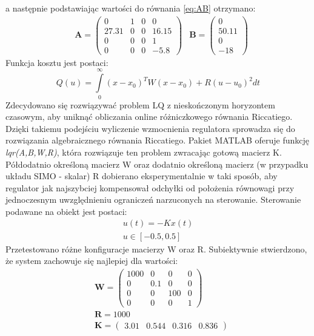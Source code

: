 a następnie podstawiając wartości do równania \ref{eq:AB} otrzymano:
\begin{equation}
\label{eq:ABwar}
\begin{aligned}
&\mathbf{A} =
\left( \begin{array}{cccc}
0 & 1 & 0 & 0 \\
27.31 & 0 & 0 & 16.15 \\
0 & 0 & 0 & 1 \\
0 & 0 & 0 & -5.8
\end{array} \right)
&\mathbf{B} =
\left( \begin{array}{cccc}
0 \\
50.11 \\
0 \\
-18
\end{array} \right)
\end{aligned}
\end{equation}
Funkcja kosztu jest postaci:
\begin{equation}
Q(u) = \int\limits_{0}^{\infty}  \left( x-x_{0}\right)^TW\left( x-x_{0}\right) + R\left( u-u_{0}\right)^2  dt
\label{eq:cost}  
\end{equation}
Zdecydowano się rozwiązywać problem LQ z nieskończonym horyzontem czasowym, aby uniknąć obliczania online różniczkowego równania Riccatiego. Dzięki takiemu podejściu wyliczenie wzmocnienia regulatora sprowadza się do rozwiązania algebraicznego równania Riccatiego. Pakiet MATLAB oferuje funkcję \textit{lqr(A,B,W,R)}, która rozwiązuje ten problem zwracając gotową macierz K. Półdodatnio określoną macierz W oraz dodatnio określoną macierz (w przypadku układu SIMO - skalar) R dobierano eksperymentalnie w taki sposób, aby regulator jak najszybciej kompensował odchyłki od położenia równowagi przy jednoczesnym uwzględnieniu ograniczeń narzuconych na sterowanie. Sterowanie podawane na obiekt jest postaci:
\begin{eqnarray}
\label{eq:u}
u(t) = -Kx(t)\\
u\in[-0.5, 0.5]    
\end{eqnarray}
Przetestowano różne konfiguracje macierzy W oraz R. Subiektywnie stwierdzono, że system zachowuje się najlepiej dla wartości:
\begin{equation}
\begin{aligned}
&\mathbf{W} =
\left( \begin{array}{cccc}
1000 & 0 & 0 & 0 \\
0 & 0.1 & 0 & 0 \\
0 & 0 & 100 & 0 \\
0 & 0 & 0 & 1
\end{array} \right)\\
&\mathbf{R} = 1000\\
&\mathbf{K} = 
\left( \begin{array}{cccc}
3.01 & 0.544 & 0.316 & 0.836
\end{array} \right)
\end{aligned}
\end{equation}
